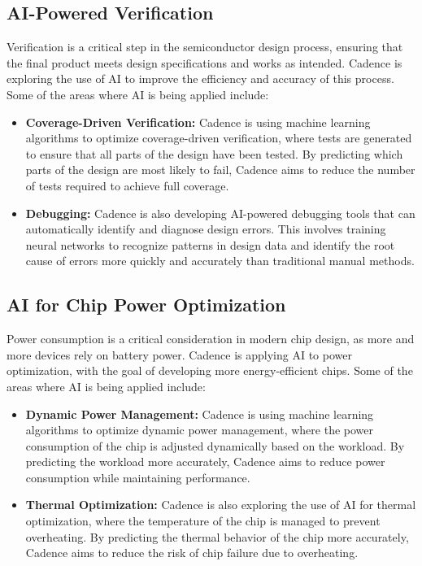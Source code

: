 \documentclass[10pt,titlepage]{book}
\begin{document}
\subsection{AI-Powered Verification}

Verification is a critical step in the semiconductor design process, ensuring that the final product meets design specifications and works as intended. Cadence is exploring the use of AI to improve the efficiency and accuracy of this process. Some of the areas where AI is being applied include:

\begin{itemize}
\item \textbf{Coverage-Driven Verification:} Cadence is using machine learning algorithms to optimize coverage-driven verification, where tests are generated to ensure that all parts of the design have been tested. By predicting which parts of the design are most likely to fail, Cadence aims to reduce the number of tests required to achieve full coverage.

\item \textbf{Debugging:} Cadence is also developing AI-powered debugging tools that can automatically identify and diagnose design errors. This involves training neural networks to recognize patterns in design data and identify the root cause of errors more quickly and accurately than traditional manual methods.
\end{itemize}

\subsection{AI for Chip Power Optimization}

Power consumption is a critical consideration in modern chip design, as more and more devices rely on battery power. Cadence is applying AI to power optimization, with the goal of developing more energy-efficient chips. Some of the areas where AI is being applied include:

\begin{itemize}
\item \textbf{Dynamic Power Management:} Cadence is using machine learning algorithms to optimize dynamic power management, where the power consumption of the chip is adjusted dynamically based on the workload. By predicting the workload more accurately, Cadence aims to reduce power consumption while maintaining performance.

\item \textbf{Thermal Optimization:} Cadence is also exploring the use of AI for thermal optimization, where the temperature of the chip is managed to prevent overheating. By predicting the thermal behavior of the chip more accurately, Cadence aims to reduce the risk of chip failure due to overheating.
\end{itemize}
\end{document}
